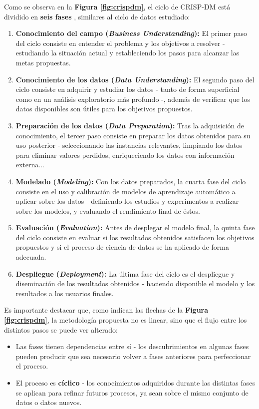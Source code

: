 Como se observa en la \textbf{Figura \ref{fig:crispdm}}, el ciclo de CRISP-DM está dividido en \textbf{seis fases} \cite{shearer2000crisp}, similares al ciclo de datos estudiado:

\begin{enumerate}
	\item \textbf{Conocimiento del campo (\textit{Business Understanding}):} El primer paso del ciclo consiste en entender el problema y los objetivos a resolver - estudiando la situación actual y estableciendo los pasos para alcanzar las metas propuestas.
	\item \textbf{Conocimiento de los datos (\textit{Data Understanding}):} El segundo paso del ciclo consiste en adquirir y estudiar los datos - tanto de forma superficial como en un análisis exploratorio más profundo -, además de verificar que los datos disponibles son útiles para los objetivos propuestos.
	\item \textbf{Preparación de los datos (\textit{Data Preparation}):} Tras la adquisición de conocimiento, el tercer paso consiste en preparar los datos obtenidos para su uso posterior - seleccionando las instancias relevantes, limpiando los datos para eliminar valores perdidos, enriqueciendo los datos con información externa...
	\item \textbf{Modelado (\textit{Modeling}):} Con los datos preparados, la cuarta fase del ciclo consiste en el uso y calibración de modelos de aprendizaje automático a aplicar sobre los datos - definiendo los estudios y experimentos a realizar sobre los modelos, y evaluando el rendimiento final de éstos.
	\item \textbf{Evaluación (\textit{Evaluation}):} Antes de desplegar el modelo final, la quinta fase del ciclo consiste en evaluar si los resultados obtenidos satisfacen los objetivos propuestos y si el proceso de ciencia de datos se ha aplicado de forma adecuada.
	\item \textbf{Despliegue (\textit{Deployment}):} La última fase del ciclo es el despliegue y diseminación de los resultados obtenidos - haciendo disponible el modelo y los resultados a los usuarios finales.
	
\end{enumerate}

Es importante destacar que, como indican las flechas de la \textbf{Figura \ref{fig:crispdm}}, la metodología propuesta no es linear, sino que el flujo entre los distintos pasos se puede ver alterado:
\begin{itemize}
	\item Las fases tienen dependencias entre sí - los descubrimientos en algunas fases pueden producir que sea necesario volver a fases anteriores para perfeccionar el proceso.
	\item El proceso es \textbf{cíclico} - los conocimientos adquiridos durante las distintas fases se aplican para refinar futuros procesos, ya sean sobre el mismo conjunto de datos o datos nuevos.
\end{itemize}

